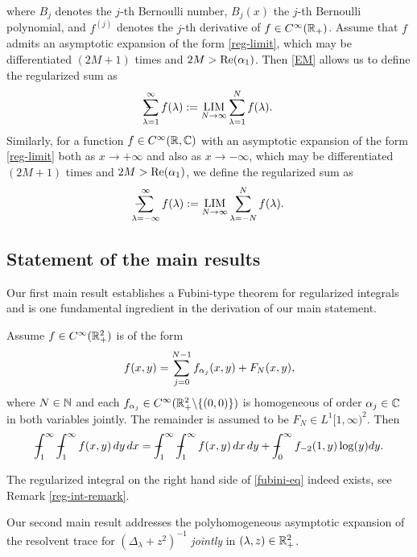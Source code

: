 where $B_j$ denotes the $j$-th Bernoulli number, $B_j(x)$ the $j$-th Bernoulli 
polynomial, and $f^{(j)}$ denotes the $j$-th derivative of $f\in C^{\infty}(\mathbb{R}_+)$. 
Assume that $f$ admits an asymptotic expansion of the form \eqref{reg-limit}, which 
may be differentiated $(2M+1)$ times and $2M>\textup{Re}(\mathrm{\alpha}_1)$. Then \eqref{EM} 
allows us to define the regularized sum as
\begin{align}
-\hspace*{-1.2em}\sum_{\lambda=1}^\infty f(\lambda) := 
\operatorname*{LIM}_{N\to \infty} \sum_{\lambda=1}^{N} f(\lambda).
\end{align}
Similarly, for a function $f\in C^\infty(\mathbb{R},\mathbb{C})$ with an asymptotic expansion 
of the form \eqref{reg-limit} both as $x\to +\infty$ and also as $x\to -\infty$, 
which may be differentiated $(2M+1)$ times and $2M>\textup{Re}(\mathrm{\alpha}_1)$, we define 
the regularized sum as
\begin{align}
-\hspace*{-1.2em}\sum_{\lambda=-\infty}^\infty f(\lambda) := 
\operatorname*{LIM}_{N\to \infty} \sum_{\lambda=-N}^{N} f(\lambda).
\end{align}

\subsection{Statement of the main results}
Our first main result establishes a Fubini-type theorem for regularized integrals and
is one fundamental ingredient in the derivation of our main statement.
\begin{theorem}
\label{fubini}
Assume $f\in C^{\infty}(\mathbb{R}_+^2)$ is of the form 
\begin{align}
f(x,y) = \sum_{j=0}^{N-1}f_{\mathrm{\alpha}_j}(x,y) + F_N(x,y),
\end{align}
where $N\in \mathbb{N}$ and each $f_{\mathrm{\alpha}_j}\in C^\infty(\mathbb{R}^2_+\backslash \{(0,0)\})$ is homogeneous of order $\mathrm{\alpha}_j\in \mathbb{C}$ in 
both variables jointly. The remainder is assumed to be $F_N\in L^1[1,\infty)^2$. Then 
\begin{align}\label{fubini-eq}
\regint_1^\infty\regint_1^\infty f(x,y) \, dy \, dx = 
\regint_1^\infty \regint_1^\infty f(x,y) \, dx \, dy + 
\regint_0^\infty f_{-2}(1,y)\log(y) dy.
\end{align}  
\end{theorem}

The regularized integral on the right hand side of \eqref{fubini-eq} 
indeed exists, see Remark \ref{reg-int-remark}. \medskip

Our second main result addresses the polyhomogeneous asymptotic expansion of the 
resolvent trace for $(\Delta_\lambda+z^2)^{-1}$ \emph{jointly} in $(\lambda,z)\in \mathbb{R}_+^2$. 

